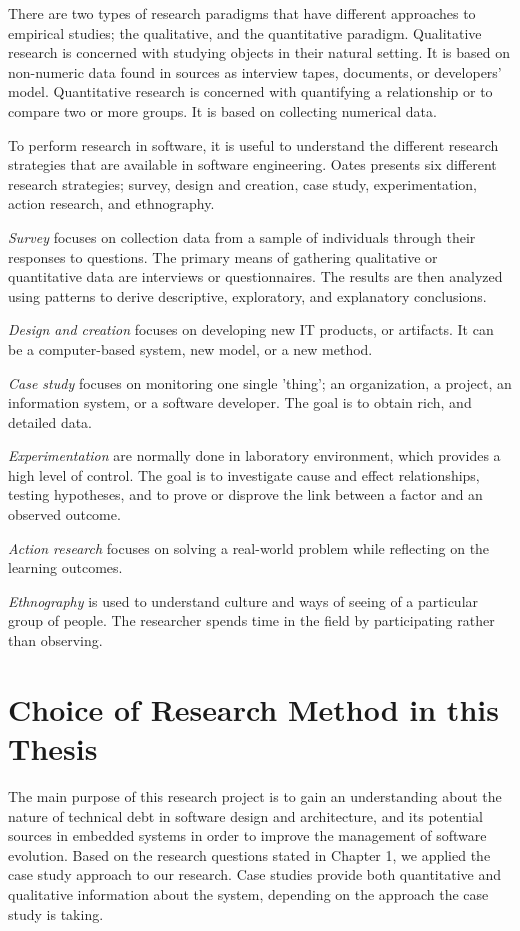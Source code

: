  There are two types of research paradigms that have different approaches to empirical studies\cite{Wohlin:2000:ESE:330775}; the qualitative, and the quantitative paradigm. Qualitative research is concerned with studying objects in their natural setting\cite{Wohlin:2000:ESE:330775}. It is based on non-numeric data found in sources as interview tapes, documents, or developers' model. Quantitative research is concerned with quantifying a relationship or to compare two or more groups\cite{Wohlin:2000:ESE:330775}. It is based on collecting numerical data. 


To perform research in software, it is useful to understand the different research strategies that are available in software engineering. Oates\cite{Oates:2006:RIS:1202299} presents six different research strategies; survey, design and creation, case study, experimentation, action research, and ethnography. 

\textit{{Survey}} focuses on collection data from a sample of individuals through their responses to questions. The primary means of gathering qualitative or quantitative data are interviews or questionnaires. The results are then analyzed using patterns to derive descriptive, exploratory, and explanatory conclusions. 

\textit{{Design and creation}} focuses on developing new IT products, or artifacts. It can be a computer-based system, new model, or a new method. 

\textit{{Case study}} focuses on monitoring one single 'thing'; an organization, a project, an information system, or a software developer. The goal is to obtain rich, and detailed data. 

\textit{{Experimentation}} are normally done in laboratory environment, which provides a high level of control. The goal is to investigate cause and effect relationships, testing hypotheses, and to prove or disprove the link between a factor and an observed outcome. 

\textit{{Action research}} focuses on solving a real-world problem while reflecting on the learning outcomes. 

\textit{{Ethnography}} is used to understand culture and ways of seeing of a particular group of people. The researcher spends time in the field by participating rather than observing.





\section{Choice of Research Method in this Thesis}
\label{sec:choiceofmethod}
The main purpose of this research project is to gain an understanding about the nature of technical debt in software design and architecture, and its potential sources in embedded systems in order to improve the management of software evolution. Based on the research questions stated in Chapter 1, we applied the case study approach to our research. Case studies provide both quantitative and qualitative information about the system\cite{Oates:2006:RIS:1202299}, depending on the approach the case study is taking.


